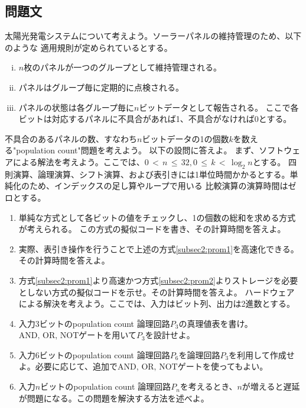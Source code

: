 \subsection{問題文}
太陽光発電システムについて考えよう。ソーラーパネルの維持管理のため、以下のような
適用規則が定められているとする。
\begin{enumerate}[(i)]
    \item $n$枚のパネルが一つのグループとして維持管理される。
    \item パネルはグループ毎に定期的に点検される。
    \item パネルの状態は各グループ毎に$n$ビットデータとして報告される。
    ここで各ビットは対応するパネルに不具合があれば1、不具合がなければ0とする。
\end{enumerate}
不具合のあるパネルの数、すなわち$n$ビットデータの1の個数$k$を数える"population count"問題を考えよう。
以下の設問に答えよ。
\newline
\newline
まず、ソフトウェアによる解法を考えよう。ここでは、$0\, <\, n\, \leq\, 32, 0\, \leq\, k\, <\, \log_{2}n$とする。
四則演算、論理演算、シフト演算、および表引きには1単位時間かかるとする。単純化のため、インデックスの足し算やループで用いる
比較演算の演算時間はゼロとする。
\begin{enumerate}[(1)]
    \item 単純な方式として各ビットの値をチェックし、1の個数の総和を求める方式が考えられる。
    この方式の擬似コードを書き、その計算時間を答えよ。\label{subsec2:prom1}
    \item 実際、表引き操作を行うことで上述の方式\eqref{subsec2:prom1}を高速化できる。その計算時間を答えよ。\label{subsec2:prom2}
    \item 方式\eqref{subsec2:prom1}より高速かつ方式\eqref{subsec2:prom2}よりストレージを必要としない方式の擬似コードを示せ。その計算時間を答えよ。\label{subsec2:prom3}
    \newline
    \newline
    ハードウェアによる解決を考えよう。ここでは、入力はビット列、出力は2進数とする。
    \item 入力3ビットのpopulation count 論理回路$P_3$の真理値表を書け。$\mathrm{AND,\, OR,\, NOT}$ゲートを用いて$P_3$を設計せよ。\label{subsec2:prom4}
    \item 入力6ビットのpopulation count 論理回路$P_6$を論理回路$P_3$を利用して作成せよ。必要に応じて、追加で$\mathrm{AND,\, OR,\, NOT}$ゲートを使ってもよい。\label{subsec2:prom5}
    \item 入力$n$ビットのpopulation count 論理回路$P_n$を考えるとき、$n$が増えると遅延が問題になる。この問題を解決する方法を述べよ。\label{subsec2:prom6}
\end{enumerate}

